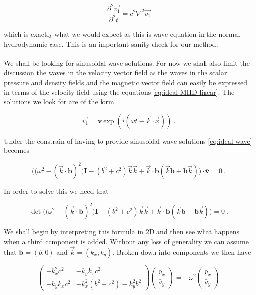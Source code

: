 $$ \frac{\partial^2 \vec{v_1}}{\partial^2 t} = c^2 \nabla^2 \vec{v_1} $$

which is exactly what we would expect as this is wave equation in the normal hydrodynamic case. This is an important sanity check for our method.\\
\\

We shall be looking for sinusoidal wave solutions. For now we shall also limit the discussion the waves in the velocity vector field as the waves in the scalar pressure and density fields and the magnetic vector field can easily be expressed in terms of the velocity field using the equations \autoref{eq:ideal-MHD-linear}. The solutions we look for are of the form

$$ \vec{v_1} = \bar{\textbf{v}} \exp(i(\omega t - \vec{k} \cdot \vec{x})) \ .$$ 

Under the constrain of having to provide sinusoidal wave solutions \autoref{eq:ideal-wave} becomes

\begin{equation}
\label{eq:plane-wave-equation}
\bigg( \big( \omega^2 - (\vec{k}\cdot \textbf{b})^2 \big)\textbf{I} - (b^2 + c^2)\vec{k}\vec{k} + \vec{k} \cdot \textbf{b}(\vec{k}\textbf{b} + \textbf{b}\vec{k}) \bigg) \cdot \bar{\textbf{v}} = 0 \ .
\end{equation} 

In order to solve this we need that 

$$ \det \bigg( \big( \omega^2 - (\vec{k}\cdot \textbf{b})^2 \big)\textbf{I} - (b^2 + c^2)\vec{k}\vec{k} + \vec{k} \cdot \textbf{b}(\vec{k}\textbf{b} + \textbf{b}\vec{k}) \bigg) = 0 \ .$$

We shall begin by interpreting this formula in 2D and then see what happens when a third component is added. Without any loss of generality we can assume that $\textbf{b} = (b, 0)$ and $\vec{k} = (k_x, k_y)$. Broken down into components we then have 

\begin{equation}
\begin{pmatrix}
 -k_x^2 c^2  &  - k_y k_x c^2 \\
- k_y k_x c^2  &    - k_x^2 (b^2 + c^2) - k_y^2 b^2
\end{pmatrix}
\begin{pmatrix}
\bar{v}_x \\
\bar{v}_y
\end{pmatrix}
 =  -\omega^2
\begin{pmatrix}
\bar{v}_x \\
\bar{v}_y
\end{pmatrix}
\end{equation} 

